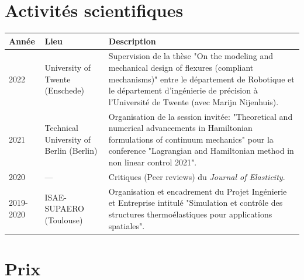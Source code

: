 \documentclass[12pt,a4paper,sans]{moderncv} %
\begin{document}
\section{Activités scientifiques}
\addtolength{\tabcolsep}{6pt}    
\begin{tabular}{p{}p{}p{}}
	Année & Lieu & Description  \\
	\hline
	2022 & University of Twente (Enschede) & Supervision de la thèse "On the modeling and mechanical design of flexures (compliant mechanisms)" entre le département de Robotique et le département d'ingénierie de précision à l'Université de Twente (avec Marijn Nijenhuis). \\
	\hline
	2021  & Technical University of Berlin (Berlin) & Organisation de la session invitée: "Theoretical and numerical advancements in Hamiltonian formulations of continuum mechanics" pour la conference "Lagrangian and Hamiltonian method in non linear control 2021". \\
	\hline
	2020 & --- & Critiques (Peer reviews) du \textit{Journal of Elasticity}. \\
	\hline
	2019-2020 & ISAE-SUPAERO (Toulouse) & Organisation et encadrement du Projet Ingénierie et Entreprise intitulé "Simulation et contrôle des structures thermoélastiques pour
	applications spatiales". \\
	\hline
\end{tabular}
\addtolength{\tabcolsep}{-2pt}


\vspace{5mm}

\section{Prix}



\vspace{5mm}
\end{document}
